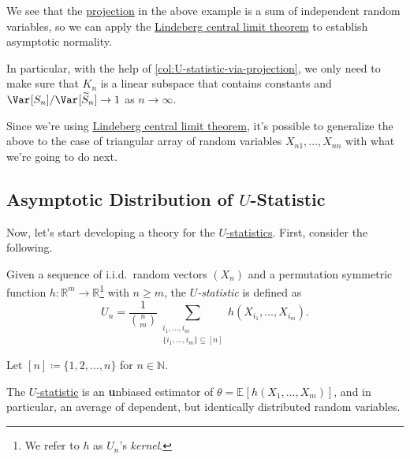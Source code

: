We see that the \hyperref[def:projection]{projection} in the above example is a sum of independent random variables, so we can apply the \hyperref[thm:Lindeberg-CLT]{Lindeberg central limit theorem} to establish asymptotic normality.

\begin{remark}
	In particular, with the help of \autoref{col:U-statistic-via-projection}, we only need to make sure that \(K_n\) is a linear subspace that contains constants and \(\Var_{}[S_n] / \Var_{}[\widetilde{S} _n] \to 1\) as \(n \to \infty \).
\end{remark}

\begin{remark}
	Since we're using \hyperref[thm:Lindeberg-CLT]{Lindeberg central limit theorem}, it's possible to generalize the above to the case of triangular array of random variables \(X_{n1}, \dots , X_{nn}\) with what we're going to do next.
\end{remark}

\subsection{Asymptotic Distribution of \(U\)-Statistic}
Now, let's start developing a theory for the \hyperref[def:U-statistic]{\(U\)-statistics}. First, consider the following.

\begin{definition}[\(U\)-statistic]\label{def:U-statistic}
	Given a sequence of i.i.d.\ random vectors \((X_n)\) and a permutation symmetric function \(h \colon \mathbb{R} ^m \to \mathbb{R} \)\footnote{We refer to \(h\) as \(U_n\)'s \emph{kernel}.} with \(n \geq m\), the \emph{\(U\)-statistic} is defined as
	\[
		U_n
		= \frac{1}{\binom{n}{m}} \sum_{\substack{i_1, \dots , i_m \\ \{ i_1, \dots , i_m \} \subseteq [n] }} h(X_{i_1}, \dots , X_{i_m}).
	\]
\end{definition}

\begin{notation}
	Let \([n] \coloneqq \{ 1, 2, \dots , n \} \) for \(n \in \mathbb{N} \).
\end{notation}

\begin{remark}
	The \hyperref[def:U-statistic]{\(U\)-statistic} is an \textbf{u}nbiased estimator of \(\theta = \mathbb{E}_{}[h(X_1, \dots , X_m)] \), and in particular, an average of dependent, but identically distributed random variables.
\end{remark}

